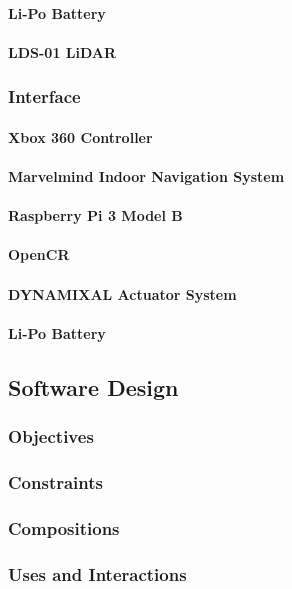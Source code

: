 \documentclass[english,12pt]{article}
\begin{document}
\paragraph{Li-Po Battery}
\paragraph{LDS-01 LiDAR}
\subsubsection{Interface}
\paragraph{Xbox 360 Controller}
\paragraph{Marvelmind Indoor Navigation System}
\paragraph{Raspberry Pi 3 Model B}
\paragraph{OpenCR}
\paragraph{DYNAMIXAL Actuator System}
\paragraph{Li-Po Battery}
\subsection{Software Design}
\subsubsection{Objectives}
\subsubsection{Constraints}
\subsubsection{Compositions}
\subsubsection{Uses and Interactions}
\end{document}
